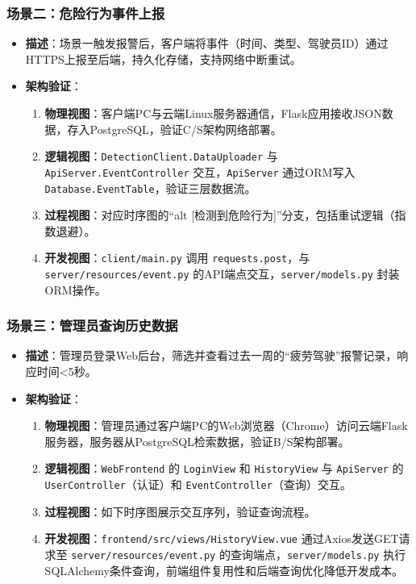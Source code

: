 \documentclass[a4paper,12pt]{article}
\begin{document}
\subsubsection{场景二：危险行为事件上报}
\begin{itemize}
  \item \textbf{描述}：场景一触发报警后，客户端将事件（时间、类型、驾驶员ID）通过HTTPS上报至后端，持久化存储，支持网络中断重试。
  \item \textbf{架构验证}：
    \begin{enumerate}
      \item \textbf{物理视图}：客户端PC与云端Linux服务器通信，Flask应用接收JSON数据，存入PostgreSQL，验证C/S架构网络部署。
      \item \textbf{逻辑视图}：\texttt{DetectionClient.DataUploader} 与 \texttt{ApiServer.EventController} 交互，\texttt{ApiServer} 通过ORM写入 \texttt{Database.EventTable}，验证三层数据流。
      \item \textbf{过程视图}：对应时序图的“alt [检测到危险行为]”分支，包括重试逻辑（指数退避）。
      \item \textbf{开发视图}：\texttt{client/main.py} 调用 \texttt{requests.post}，与 \texttt{server/resources/event.py} 的API端点交互，\texttt{server/models.py} 封装ORM操作。
    \end{enumerate}
\end{itemize}

\subsubsection{场景三：管理员查询历史数据}
\begin{itemize}
  \item \textbf{描述}：管理员登录Web后台，筛选并查看过去一周的“疲劳驾驶”报警记录，响应时间<5秒。
  \item \textbf{架构验证}：
    \begin{enumerate}
      \item \textbf{物理视图}：管理员通过客户端PC的Web浏览器（Chrome）访问云端Flask服务器，服务器从PostgreSQL检索数据，验证B/S架构部署。
      \item \textbf{逻辑视图}：\texttt{WebFrontend} 的 \texttt{LoginView} 和 \texttt{HistoryView} 与 \texttt{ApiServer} 的 \texttt{UserController}（认证）和 \texttt{EventController}（查询）交互。
      \item \textbf{过程视图}：如下时序图展示交互序列，验证查询流程。
      \item \textbf{开发视图}：\texttt{frontend/src/views/HistoryView.vue} 通过Axios发送GET请求至 \texttt{server/resources/event.py} 的查询端点，\texttt{server/models.py} 执行SQLAlchemy条件查询，前端组件复用性和后端查询优化降低开发成本。
    \end{enumerate}
\end{itemize}
\end{document}
